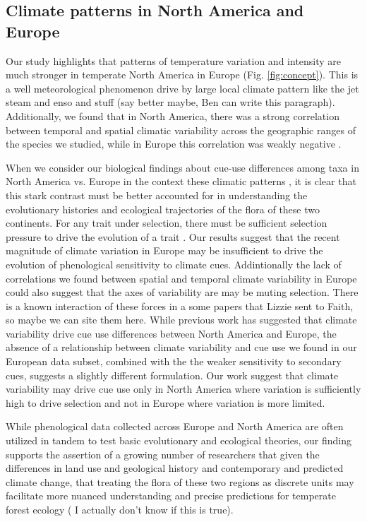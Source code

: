 \documentclass[12pt]{article}\usepackage[]{graphicx}\usepackage[]{color}
\begin{document}
\subsection*{Climate patterns in North America and Europe}
Our study highlights that patterns of temperature variation and intensity are much stronger in temperate North America in Europe (Fig. \ref{fig:concept}). This is a well meteorological phenomenon drive by large local climate pattern like the jet steam and enso and stuff (say better maybe, Ben can write this paragraph). Additionally, we found that in North America, there was a strong correlation between temporal and spatial climatic variability across the geographic ranges of the species we studied, while in Europe this correlation was weakly negative .

\noindent When we consider our biological findings about cue-use differences among taxa in North America vs. Europe in the context these climatic patterns , it is clear that this stark contrast must be better accounted for in understanding the evolutionary histories and ecological trajectories of the flora of these two continents. For any trait under selection, there must be sufficient selection pressure to drive the evolution of a trait \citep{}. Our results suggest that the recent magnitude of climate variation in Europe may be insufficient to drive the evolution of phenological sensitivity to climate cues. Addintionally the lack of correlations we found between spatial and temporal climate variability in Europe could also suggest  that the axes of variability are may be muting selection. There is a known interaction of these forces in a some papers that Lizzie sent to Faith, so maybe we can site them here. While previous work has suggested that climate variability drive cue use differences between North America and Europe, the absence of a relationship between climate variability and cue use we found in our European data subset, combined with the the weaker sensitivity to secondary cues, suggests a slightly different formulation. Our work suggest that climate variability may drive cue use only in North America where variation is sufficiently high to drive selection and not in Europe where variation is more limited. 

\noindeny While phenological data collected across Europe and North America are often utilized in tandem to test basic evolutionary and ecological theories, our finding supports the assertion of a growing number of researchers that given the differences in land use and geological history and contemporary and predicted climate change, that treating the flora of these two regions as discrete units may facilitate more nuanced understanding and precise predictions for temperate forest ecology ( I actually don't know if this is true).
\end{document}
